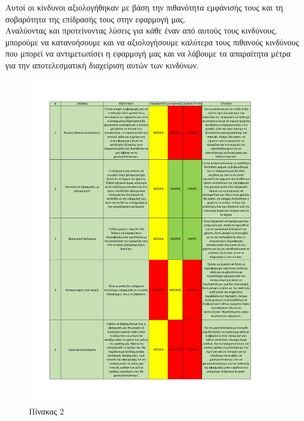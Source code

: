 \documentclass[11pt]{scrartcl} %
\begin{document}
Αυτοί οι κίνδυνοι αξιολογήθηκαν με βάση την πιθανότητα εμφάνισής τους και τη σοβαρότητα της επίδρασής τους στην εφαρμογή μας. \\

Αναλύοντας και προτείνοντας λύσεις για κάθε έναν από αυτούς τους κινδύνους, μπορούμε να κατανοήσουμε και να αξιολογήσουμε καλύτερα τους πιθανούς κινδύνους που μπορεί να αντιμετωπίσει η εφαρμογή μας και να λάβουμε τα απαραίτητα μέτρα για την αποτελεσματική διαχείριση αυτών των κινδύνων. \\

\begin{figure}
    \hspace{-3.3cm}
    \includegraphics[trim = 0cm 2cm 0cm 1.8cm, clip]{assets/table_2.pdf}
    \caption{Πίνακας 2}
\end{figure}
\end{document}

